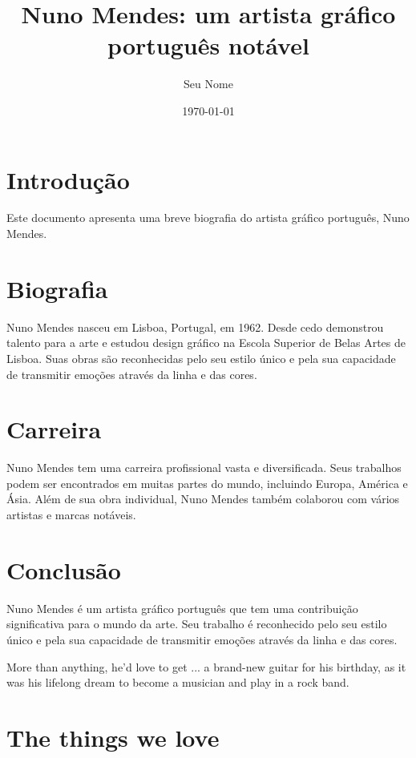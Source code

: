 \documentclass[12pt]{article}
\title{Nuno Mendes: um artista gráfico português notável}
\author{Seu Nome}
\date{\today}
\begin{document}
\maketitle

\section{Introdução}
Este documento apresenta uma breve biografia do artista gráfico português, Nuno Mendes.

\section{Biografia}
Nuno Mendes nasceu em Lisboa, Portugal, em 1962. Desde cedo demonstrou talento para a arte e estudou design gráfico na Escola Superior de Belas Artes de Lisboa. Suas obras são reconhecidas pelo seu estilo único e pela sua capacidade de transmitir emoções através da linha e das cores.

\section{Carreira}
Nuno Mendes tem uma carreira profissional vasta e diversificada. Seus trabalhos podem ser encontrados em muitas partes do mundo, incluindo Europa, América e Ásia. Além de sua obra individual, Nuno Mendes também colaborou com vários artistas e marcas notáveis.

\section{Conclusão}
Nuno Mendes é um artista gráfico português que tem uma contribuição significativa para o mundo da arte. Seu trabalho é reconhecido pelo seu estilo único e pela sua capacidade de transmitir emoções através da linha e das cores.

More than anything, he'd love to get ... a brand-new guitar for his birthday, as it was his lifelong dream to become a musician and play in a rock band.

\section{The things we love}
\end{document}
